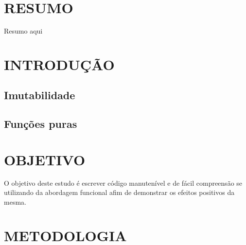 \documentclass[date,twocolumn,a4paper]{ppgem}
\begin{document}
\thispagestyle{plain}
\makeheader




\section*{RESUMO}
Resumo aqui

\section{INTRODUÇÃO}
\subsection{Imutabilidade}
\subsection{Funções puras}

\section{OBJETIVO}
O objetivo deste estudo é escrever código manutenível e de fácil compreensão se utilizando da abordagem funcional
afim de demonstrar os efeitos positivos da mesma.

\section{METODOLOGIA}
\end{document}
